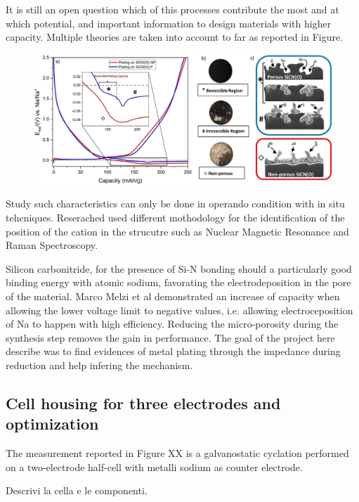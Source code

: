 It is still an open question which of this processes contribute the most and at which potential, and important information to design materials with higher capacity. Multiple theories are taken into account to far as reported in Figure.
\begin{figure}
    \includegraphics[width = \textwidth]{figures/application3/image4.png}
\end{figure}
Study such characteristics can only be done in operando condition with in situ tehcniques. Reserached used different mothodology for the identification of the position of the cation in the strucutre such as Nuclear Magnetic Resonance and Raman Spectroscopy. 

Silicon carbonitride, for the presence of Si-N bonding should a particularly good binding energy with atomic sodium, favorating the electrodeposition in the pore of the material. Marco Melzi et al demonstrated an increase of capacity when allowing the lower voltage limit to negative values, i.e. allowing electroceposition of Na to happen with high efficiency. Reducing the micro-porosity during the synthesis step removes the gain in performance. The goal of the project here describe was to find evidences of metal plating through the impedance during reduction and help infering the mechanism.

\subsection{Cell housing for three electrodes and optimization}
The measurement reported in Figure XX is a galvanostatic cyclation performed on a two-electrode half-cell with metalli sodium as counter electrode.

Descrivi la cella e le componenti.

